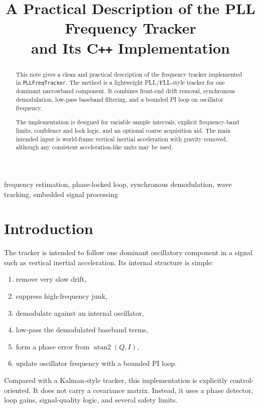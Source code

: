 \documentclass[conference]{IEEEtran}
\title{A Practical Description of the PLL Frequency Tracker\\
and Its C\texttt{++} Implementation}
\author{%
  \IEEEauthorblockN{Mikhail S.\ Grushinskiy}
  \IEEEauthorblockA{Independent Researcher\\
  Bareboat Necessities Project\\
  \texttt{mgrouch@users.github.com}}
}
\begin{document}
\maketitle

\begin{abstract}
This note gives a clean and practical description of the frequency tracker
implemented in \texttt{PLLFreqTracker}. The method is a lightweight
PLL/FLL-style tracker for one dominant narrowband component. It combines
front-end drift removal, synchronous demodulation, low-pass baseband
filtering, and a bounded PI loop on oscillator frequency.

The implementation is designed for variable sample intervals, explicit
frequency-band limits, confidence and lock logic, and an optional coarse
acquisition aid. The main intended input is world-frame vertical inertial
acceleration with gravity removed, although any consistent
acceleration-like units may be used.
\end{abstract}

\begin{IEEEkeywords}
frequency estimation, phase-locked loop, synchronous demodulation, wave
tracking, embedded signal processing
\end{IEEEkeywords}

\section{Introduction}

The tracker is intended to follow one dominant oscillatory component in a
signal such as vertical inertial acceleration. Its internal structure is
simple:

\begin{enumerate}[leftmargin=1.5em]
  \item remove very slow drift,
  \item suppress high-frequency junk,
  \item demodulate against an internal oscillator,
  \item low-pass the demodulated baseband terms,
  \item form a phase error from \(\operatorname{atan2}(Q,I)\),
  \item update oscillator frequency with a bounded PI loop.
\end{enumerate}

Compared with a Kalman-style tracker, this implementation is explicitly
control-oriented. It does not carry a covariance matrix. Instead, it uses a
phase detector, loop gains, signal-quality logic, and several safety limits.
\end{document}
